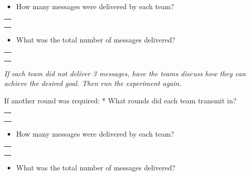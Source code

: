 \documentclass[11pt]{article}
\providecommand{\tightlist}{%
      \setlength{\itemsep}{0pt}\setlength{\parskip}{0pt}}
\begin{document}
\begin{itemize}
\tightlist
\item
  How many messages were delivered by each team?
\end{itemize}

\begin{longtable}[]{@{}l@{}}
\toprule
 \\
\midrule
\endhead
 \\
 \\
 \\
\bottomrule
\end{longtable}

\begin{itemize}
\tightlist
\item
  What was the total number of messages delivered?
\end{itemize}

\begin{longtable}[]{@{}l@{}}
\toprule
 \\
\midrule
\endhead
 \\
 \\
 \\
\bottomrule
\end{longtable}

\emph{If each team did not deliver 3 messages, have the teams discuss
how they can achieve the desired goal. Then run the experiment again.}

If another round was required: * What rounds did each team transmit in?

\begin{longtable}[]{@{}l@{}}
\toprule
 \\
\midrule
\endhead
 \\
 \\
 \\
\bottomrule
\end{longtable}

\begin{itemize}
\tightlist
\item
  How many messages were delivered by each team?
\end{itemize}

\begin{longtable}[]{@{}l@{}}
\toprule
 \\
\midrule
\endhead
 \\
 \\
 \\
\bottomrule
\end{longtable}

\begin{itemize}
\tightlist
\item
  What was the total number of messages delivered?
\end{itemize}
\end{document}
